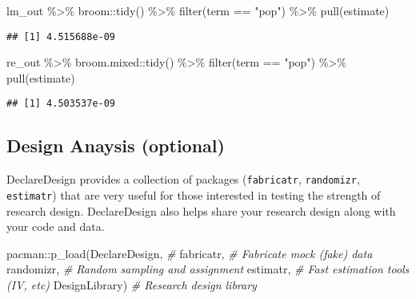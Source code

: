 \documentclass[
]{book}
\newenvironment{Shaded}{\begin{snugshade}}{\end{snugshade}}
\newcommand{\CommentTok}[1]{\textcolor[rgb]{0.56,0.35,0.01}{\textit{#1}}}
\newcommand{\FunctionTok}[1]{\textcolor[rgb]{0.00,0.00,0.00}{#1}}
\newcommand{\NormalTok}[1]{#1}
\newcommand{\SpecialCharTok}[1]{\textcolor[rgb]{0.00,0.00,0.00}{#1}}
\newcommand{\StringTok}[1]{\textcolor[rgb]{0.31,0.60,0.02}{#1}}
\begin{document}
\begin{Shaded}
\begin{Highlighting}[]
\NormalTok{lm\_out }\SpecialCharTok{\%\textgreater{}\%} 
\NormalTok{  broom}\SpecialCharTok{::}\FunctionTok{tidy}\NormalTok{() }\SpecialCharTok{\%\textgreater{}\%}
  \FunctionTok{filter}\NormalTok{(term }\SpecialCharTok{==} \StringTok{"pop"}\NormalTok{) }\SpecialCharTok{\%\textgreater{}\%}
  \FunctionTok{pull}\NormalTok{(estimate)}
\end{Highlighting}
\end{Shaded}

\begin{verbatim}
## [1] 4.515688e-09
\end{verbatim}

\begin{Shaded}
\begin{Highlighting}[]
\NormalTok{re\_out }\SpecialCharTok{\%\textgreater{}\%}
\NormalTok{  broom.mixed}\SpecialCharTok{::}\FunctionTok{tidy}\NormalTok{() }\SpecialCharTok{\%\textgreater{}\%}
  \FunctionTok{filter}\NormalTok{(term }\SpecialCharTok{==} \StringTok{"pop"}\NormalTok{) }\SpecialCharTok{\%\textgreater{}\%}
  \FunctionTok{pull}\NormalTok{(estimate)}
\end{Highlighting}
\end{Shaded}

\begin{verbatim}
## [1] 4.503537e-09
\end{verbatim}

\hypertarget{design-anaysis-optional}{%
\subsection{Design Anaysis (optional)}\label{design-anaysis-optional}}

DeclareDesign provides a collection of packages (\texttt{fabricatr}, \texttt{randomizr}, \texttt{estimatr}) that are very useful for those interested in testing the strength of research design. DeclareDesign also helps share your research design along with your code and data.

\begin{Shaded}
\begin{Highlighting}[]
\NormalTok{pacman}\SpecialCharTok{::}\FunctionTok{p\_load}\NormalTok{(DeclareDesign, }\CommentTok{\#  }
\NormalTok{               fabricatr, }\CommentTok{\# Fabricate mock (fake) data  }
\NormalTok{               randomizr, }\CommentTok{\# Random sampling and assignment }
\NormalTok{               estimatr, }\CommentTok{\# Fast estimation tools (IV, etc) }
\NormalTok{               DesignLibrary) }\CommentTok{\# Research design library }
\end{Highlighting}
\end{Shaded}
\end{document}
